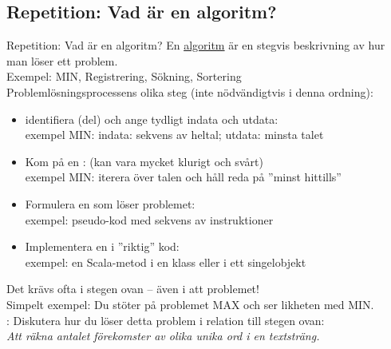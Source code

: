 

\ifkompendium\else
\subsection{Repetition: Vad är en algoritm?}
\begin{Slide}{Repetition: Vad är en algoritm? }\SlideFontSmall
En \href{https://sv.wikipedia.org/wiki/Algoritm}{algoritm} är en stegvis beskrivning av hur man löser ett problem. \\ 
Exempel: MIN, Registrering, Sökning, Sortering \\
\vspace{1em}
Problemlösningsprocessens olika steg (inte nödvändigtvis i denna ordning): 
\begin{itemize}
\item identifiera (del) och ange tydligt indata och utdata: \\ exempel MIN: indata: sekvens av heltal; utdata: minsta talet
\item Kom på en : (kan  vara mycket klurigt och svårt) \\ exempel MIN: iterera över talen och håll reda på ''minst hittills''
\item Formulera en  som löser problemet: \\ exempel: pseudo-kod med sekvens av instruktioner
\item Implementera en  i ''riktig'' kod: \\ exempel: en Scala-metod i en klass eller i ett singelobjekt
\end{itemize}
Det krävs ofta  i stegen ovan  -- även i att  problemet!\\
Simpelt exempel: Du stöter på problemet MAX och ser likheten med MIN.\\
\vspace{0.5em}
\pause{}: Diskutera hur du löser detta problem i relation till stegen ovan: \\
\emph{Att räkna antalet förekomster av olika unika ord i en textsträng.} 
\end{Slide}


\fi











